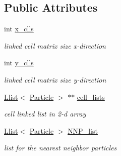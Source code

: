 \subsection*{Public Attributes}
\begin{CompactItemize}
\item 
\hypertarget{classParticleManager_26e6109376eb2a1dc37f7fe623aaf528}{
int \hyperlink{classParticleManager_26e6109376eb2a1dc37f7fe623aaf528}{x\_\-clls}}
\label{classParticleManager_26e6109376eb2a1dc37f7fe623aaf528}

\begin{CompactList}\small\item\em linked cell matrix size x-direction \item\end{CompactList}\item 
\hypertarget{classParticleManager_09eae89d0d9e56d988e40cdebf13825b}{
int \hyperlink{classParticleManager_09eae89d0d9e56d988e40cdebf13825b}{y\_\-clls}}
\label{classParticleManager_09eae89d0d9e56d988e40cdebf13825b}

\begin{CompactList}\small\item\em linked cell matrix size y-direction \item\end{CompactList}\item 
\hypertarget{classParticleManager_0b7d522a4ecc14073c1adbb42c23fc84}{
\hyperlink{classLlist}{Llist}$<$ \hyperlink{classParticle}{Particle} $>$ $\ast$$\ast$ \hyperlink{classParticleManager_0b7d522a4ecc14073c1adbb42c23fc84}{cell\_\-lists}}
\label{classParticleManager_0b7d522a4ecc14073c1adbb42c23fc84}

\begin{CompactList}\small\item\em cell linked list in 2-d array \item\end{CompactList}\item 
\hypertarget{classParticleManager_8f47c372d7ea5ff68657defd7a492e85}{
\hyperlink{classLlist}{Llist}$<$ \hyperlink{classParticle}{Particle} $>$ \hyperlink{classParticleManager_8f47c372d7ea5ff68657defd7a492e85}{NNP\_\-list}}
\label{classParticleManager_8f47c372d7ea5ff68657defd7a492e85}

\begin{CompactList}\small\item\em list for the nearest neighbor particles \item\end{CompactList}\end{CompactItemize}
